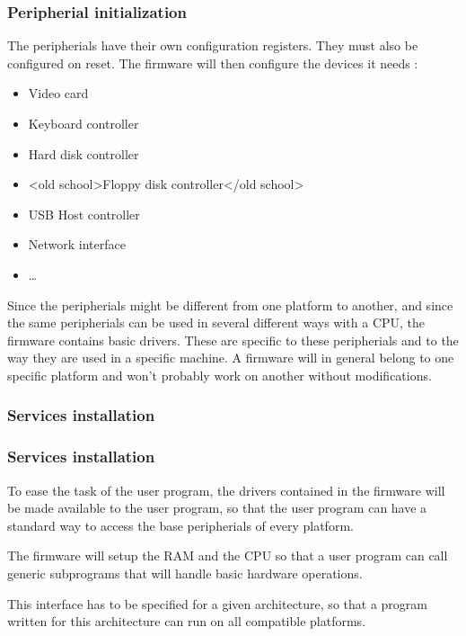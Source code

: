 \begin{frame}
  \frametitle{Peripherial initialization}

  The peripherials have their own configuration registers. They must also be configured on reset. The firmware will then configure the devices it needs :

  \-

  \begin{itemize}
  \item Video card
  \item Keyboard controller
  \item Hard disk controller
  \item {<old school>Floppy disk controller</old school>}
  \item USB Host controller
  \item Network interface
  \item \ldots
  \end{itemize}

  \-

  Since the peripherials might be different from one platform to another, and since the same peripherials can be used in several different ways with a CPU, the firmware contains basic drivers. These are specific to these peripherials and to the way they are used in a specific machine. A firmware will in general belong to one specific platform and won't probably work on another without modifications.

\end{frame}

\subsubsection{Services installation}

\begin{frame}
  \frametitle{Services installation}

  To ease the task of the user program, the drivers contained in the firmware will be made available to the user program, so that the user program can have a standard way to access the base peripherials of every platform.

  \-

  The firmware will setup the RAM and the CPU so that a user program can call generic subprograms that will handle basic hardware operations.

  \-

  This interface has to be specified for a given architecture, so that a program written for this architecture can run on all compatible platforms.

  \end{frame}

